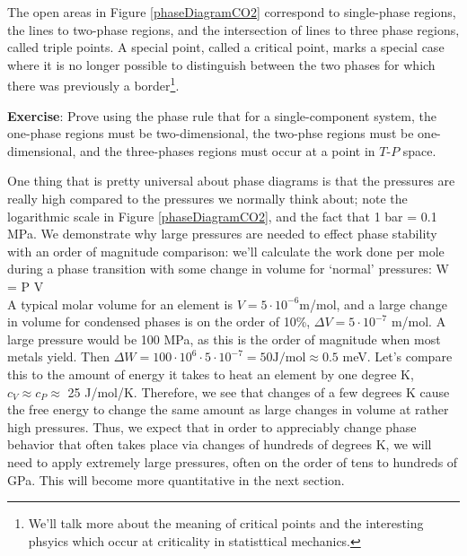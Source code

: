 \documentclass[12pt]{article}
\begin{document}
The open areas in Figure \ref{phaseDiagramCO2} correspond to single-phase regions, the lines to two-phase regions, and the intersection of lines to three phase regions, called triple points. A special point, called a critical point, marks a special case where it is no longer possible to distinguish between the two phases for which there was previously a border\footnote{We'll talk more about the meaning of critical points and the interesting phsyics which occur at criticality in statisttical mechanics.}.

\textbf{Exercise}: Prove using the phase rule that for a single-component system, the one-phase regions must be two-dimensional, the two-phse regions must be one-dimensional, and the three-phases regions must occur at a point in $T$-$P$ space.

One thing that is pretty universal about phase diagrams is that the pressures are really high compared to the pressures we normally think about; note the logarithmic scale in Figure \ref{phaseDiagramCO2}, and the fact that 1 bar = 0.1 MPa. We demonstrate why large pressures are needed to effect phase stability with an order of magnitude comparison: we'll calculate the work done per mole during a phase transition with some change in volume for `normal' pressures:
\eqs
\Delta W = P \cdot \Delta V\\
\eqe
A typical molar volume for an element is $V = 5 \cdot 10^{-6}$m\three/mol, and a large change in volume for condensed phases is on the order of 10\%, $\Delta V = 5 \cdot 10^{-7}$ m\three/mol. A large pressure would be 100 MPa, as this is the order of magnitude when most metals yield. Then $\Delta W = 100\cdot 10^{6} \cdot 5 \cdot 10^{-7} = 50 \text{J/mol} \approx 0.5$ meV. Let's compare this to the amount of energy it takes to heat an element by one degree K, $c_V\approx c_P \approx$ 25 J/mol/K. Therefore, we see that changes of a few degrees K cause the free energy to change the same amount as large changes in volume at rather high pressures. Thus, we expect that in order to appreciably change phase behavior that often takes place via changes of hundreds of degrees K, we will need to apply extremely large pressures, often on the order of tens to hundreds of GPa. This will become more quantitative in the next section.

\end{document}
